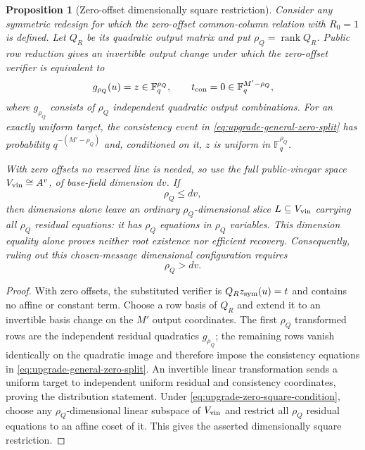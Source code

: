\documentclass[11pt]{article}
\newtheorem{proposition}[theorem]{Proposition}
\newcommand{\F}{\mathbb F}
\newcommand{\rank}{\operatorname{rank}}
\begin{document}
\begin{proposition}[Zero-offset dimensionally square restriction]
\label{prop:upgrade-zero-offset-square-persistence}
Consider any symmetric redesign for which the zero-offset common-column
relation with $R_0=1$ is defined.  Let $Q_R$ be its quadratic output matrix
and put $\rho_Q=\rank Q_R$.  Public row reduction gives an invertible output
change under which the zero-offset verifier is equivalent to
\begin{equation}
 g_{\rho_Q}(u)=z\in\F_q^{\rho_Q},
 \qquad
 t_{\rm con}=0\in\F_q^{M'-\rho_Q},                     \label{eq:upgrade-general-zero-split}
\end{equation}
where $g_{\rho_Q}$ consists of $\rho_Q$ independent quadratic output
combinations.  For an exactly uniform target, the consistency event in
\eqref{eq:upgrade-general-zero-split} has probability $q^{-(M'-\rho_Q)}$ and,
conditioned on it, $z$ is uniform in $\F_q^{\rho_Q}$.

With zero offsets no reserved line is needed, so use the full public-vinegar
space $V_{\rm vin}\cong A^v$, of base-field dimension $dv$.  If
\begin{equation}
 \rho_Q\le dv,                                          \label{eq:upgrade-zero-square-condition}
\end{equation}
then dimensions alone leave an ordinary $\rho_Q$-dimensional slice
$L\subseteq V_{\rm vin}$ carrying all $\rho_Q$ residual equations: it has
$\rho_Q$ equations in $\rho_Q$ variables.  This dimension equality alone
proves neither root existence nor efficient recovery.  Consequently, ruling
out this chosen-message dimensional configuration requires
\begin{equation}
 \rho_Q>dv.                                             \label{eq:upgrade-zero-square-rank-floor}
\end{equation}
\end{proposition}

\begin{proof}
With zero offsets, the substituted verifier is $Q_Rz_{\rm sym}(u)=t$ and
contains no affine or constant term.  Choose a row basis of $Q_R$ and extend
it to an invertible basis change on the $M'$ output coordinates.  The first
$\rho_Q$ transformed rows are the independent residual quadratics
$g_{\rho_Q}$; the remaining rows vanish identically on the quadratic image and
therefore impose the consistency equations in
\eqref{eq:upgrade-general-zero-split}.  An invertible linear transformation
sends a uniform target to independent uniform residual and consistency
coordinates, proving the distribution statement.  Under
\eqref{eq:upgrade-zero-square-condition}, choose any $\rho_Q$-dimensional
linear subspace of $V_{\rm vin}$ and restrict all $\rho_Q$ residual equations
to an affine coset of it.  This gives the asserted dimensionally square
restriction.
\end{proof}
\end{document}
